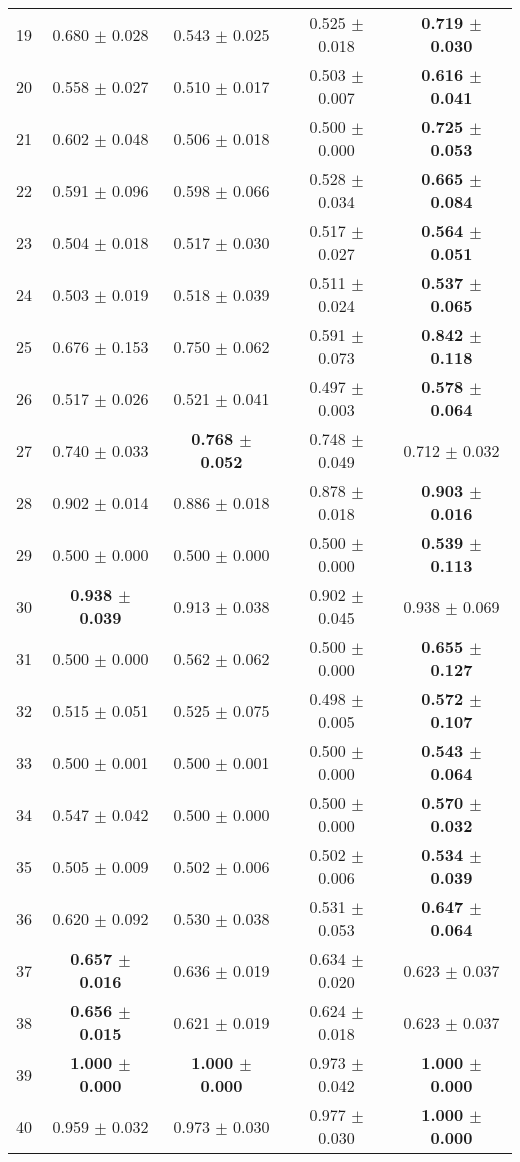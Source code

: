 \begin{table}[!ht]
{\begin{tabular}{r c c c c}
19 & 0.680 $\pm$ 0.028 & 0.543 $\pm$ 0.025 & 0.525 $\pm$ 0.018 & \textbf{0.719 $\pm$ 0.030} \\
20 & 0.558 $\pm$ 0.027 & 0.510 $\pm$ 0.017 & 0.503 $\pm$ 0.007 & \textbf{0.616 $\pm$ 0.041} \\
21 & 0.602 $\pm$ 0.048 & 0.506 $\pm$ 0.018 & 0.500 $\pm$ 0.000 & \textbf{0.725 $\pm$ 0.053} \\
22 & 0.591 $\pm$ 0.096 & 0.598 $\pm$ 0.066 & 0.528 $\pm$ 0.034 & \textbf{0.665 $\pm$ 0.084} \\
23 & 0.504 $\pm$ 0.018 & 0.517 $\pm$ 0.030 & 0.517 $\pm$ 0.027 & \textbf{0.564 $\pm$ 0.051} \\
24 & 0.503 $\pm$ 0.019 & 0.518 $\pm$ 0.039 & 0.511 $\pm$ 0.024 & \textbf{0.537 $\pm$ 0.065} \\
25 & 0.676 $\pm$ 0.153 & 0.750 $\pm$ 0.062 & 0.591 $\pm$ 0.073 & \textbf{0.842 $\pm$ 0.118} \\
26 & 0.517 $\pm$ 0.026 & 0.521 $\pm$ 0.041 & 0.497 $\pm$ 0.003 & \textbf{0.578 $\pm$ 0.064} \\
27 & 0.740 $\pm$ 0.033 & \textbf{0.768 $\pm$ 0.052} & 0.748 $\pm$ 0.049 & 0.712 $\pm$ 0.032 \\
28 & 0.902 $\pm$ 0.014 & 0.886 $\pm$ 0.018 & 0.878 $\pm$ 0.018 & \textbf{0.903 $\pm$ 0.016} \\
29 & 0.500 $\pm$ 0.000 & 0.500 $\pm$ 0.000 & 0.500 $\pm$ 0.000 & \textbf{0.539 $\pm$ 0.113} \\
30 & \textbf{0.938 $\pm$ 0.039} & 0.913 $\pm$ 0.038 & 0.902 $\pm$ 0.045 & 0.938 $\pm$ 0.069 \\
31 & 0.500 $\pm$ 0.000 & 0.562 $\pm$ 0.062 & 0.500 $\pm$ 0.000 & \textbf{0.655 $\pm$ 0.127} \\
32 & 0.515 $\pm$ 0.051 & 0.525 $\pm$ 0.075 & 0.498 $\pm$ 0.005 & \textbf{0.572 $\pm$ 0.107} \\
33 & 0.500 $\pm$ 0.001 & 0.500 $\pm$ 0.001 & 0.500 $\pm$ 0.000 & \textbf{0.543 $\pm$ 0.064} \\
34 & 0.547 $\pm$ 0.042 & 0.500 $\pm$ 0.000 & 0.500 $\pm$ 0.000 & \textbf{0.570 $\pm$ 0.032} \\
35 & 0.505 $\pm$ 0.009 & 0.502 $\pm$ 0.006 & 0.502 $\pm$ 0.006 & \textbf{0.534 $\pm$ 0.039} \\
36 & 0.620 $\pm$ 0.092 & 0.530 $\pm$ 0.038 & 0.531 $\pm$ 0.053 & \textbf{0.647 $\pm$ 0.064} \\
37 & \textbf{0.657 $\pm$ 0.016} & 0.636 $\pm$ 0.019 & 0.634 $\pm$ 0.020 & 0.623 $\pm$ 0.037 \\
38 & \textbf{0.656 $\pm$ 0.015} & 0.621 $\pm$ 0.019 & 0.624 $\pm$ 0.018 & 0.623 $\pm$ 0.037 \\
39 & \textbf{1.000 $\pm$ 0.000} & \textbf{1.000 $\pm$ 0.000} & 0.973 $\pm$ 0.042 & \textbf{1.000 $\pm$ 0.000} \\
40 & 0.959 $\pm$ 0.032 & 0.973 $\pm$ 0.030 & 0.977 $\pm$ 0.030 & \textbf{1.000 $\pm$ 0.000} \\
\end{tabular}}
\end{table}
